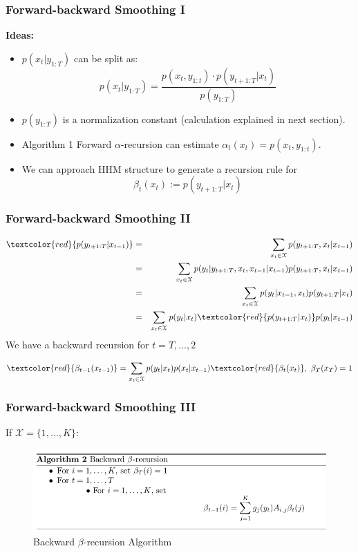 \documentclass[xcolor=dvipsnames, compress]{beamer}
\begin{document}
\begin{frame}
\frametitle{Forward-backward Smoothing I}

\textbf{Ideas:}

\begin{itemize}
\item  $p(x_t |y_{1:T})$ can be split as:
$$p(x_t |y_{1:T}) = \frac{p(x_t , y_{1:t} ) \cdot p(y_{t+1:T} |x_t )}
	{p(y_{1:T})}$$
	
\item $p(y_{1:T})$ is a normalization constant (calculation explained in next section).
	
\item Algorithm 1 Forward $\alpha$-recursion can estimate $\alpha_t(x_t)=p(x_t , y_{1:t} )$.

\item We can approach HHM structure to generate a recursion rule for $$\beta_t(x_t):=p(y_{t+1:T} |x_t )$$

\end{itemize}

\end{frame}

\begin{frame}
\frametitle{Forward-backward Smoothing II}
\begin{eqnarray*}
\textcolor{red}{p(y_{t+1:T} |x_{t-1} )} & = & \sum_{x_t \in \mathcal{X}} p(y_{t+1:T},x_t |x_{t-1} )\\
                       & = & \sum_{x_t \in \mathcal{X}} p(y_{t}|y_{t+1:T},x_t,x_{t-1} |x_{t-1} ) p(y_{t+1:T},x_t |x_{t-1} ) \\
     & = & \sum_{x_t \in \mathcal{X}} p(y_{t}|x_{t-1},x_t) p(y_{t+1:T}|x_t)\\
     & = & \sum_{x_t \in \mathcal{X}} p(y_{t}|x_t) \textcolor{red}{p(y_{t+1:T}|x_t)} p(y_{t}|x_{t-1})\\   
\end{eqnarray*}
We have a backward recursion for $t=T, \ldots, 2$

$$ \textcolor{red}{\beta_{t-1}(x_{t-1})} = \sum_{x_t \in \mathcal{X}} p(y_{t}|x_t)  p(x_{t}|x_{t-1}) \textcolor{red}{\beta_t(x_t)}, \mbox{ } \beta_T(x_T)=1 $$

\end{frame}

\begin{frame}
\frametitle{Forward-backward Smoothing III}

If $\mathcal{X}=\{1,\ldots, K\}$:
\begin{figure}
	\includegraphics[scale=0.45]{images/backward_beta_recursion.jpg}
	\caption{Backward $\beta$-recursion Algorithm}
\end{figure}
\end{frame}
\end{document}
